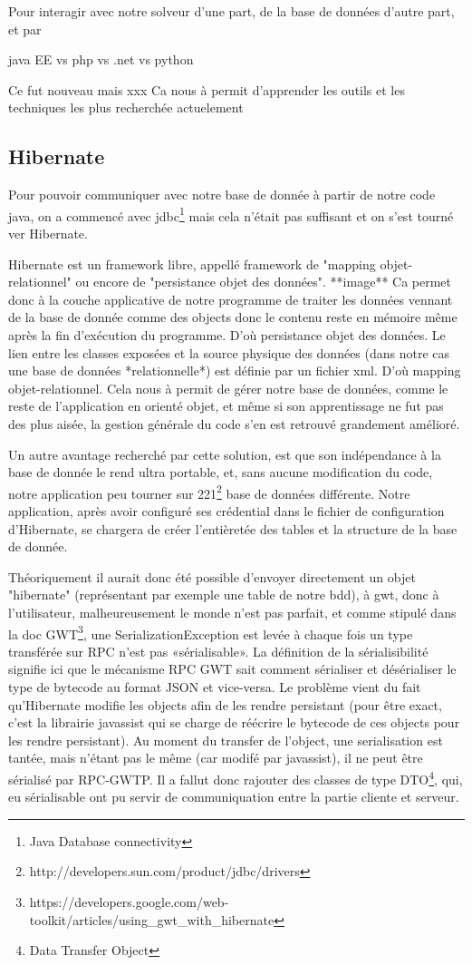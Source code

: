 Pour interagir avec notre solveur d'une part, de la base de données d'autre part, et par


java EE vs php vs .net vs python

Ce fut nouveau mais xxx
Ca nous à permit d'apprender les outils et les techniques les plus recherchée actuelement 

\subsection{Hibernate}

Pour pouvoir communiquer avec notre base de donnée à partir de notre code java, on a commencé avec jdbc\footnote{Java Database connectivity} mais cela n'était pas suffisant et on s'est tourné ver Hibernate.

Hibernate est un framework libre, appellé framework de  "mapping objet-relationnel" ou encore de "persistance objet des données". 
**image**
Ca permet donc à la couche applicative de notre programme de traiter les données vennant de la base de donnée comme des objects donc le contenu reste en mémoire même après la fin d'exécution du programme. D'où persistance objet des données. Le lien entre les classes exposées et la source physique des données (dans notre cas une base de données *relationnelle*) est définie par un fichier xml. D'où mapping objet-relationnel.
Cela nous à permit de gérer notre base de données, comme le reste de l'application en orienté objet, et même si son apprentissage ne fut pas des plus aisée, la gestion générale du code s'en est retrouvé grandement amélioré.

Un autre avantage recherché par cette solution, est que son indépendance à la base de donnée le rend ultra portable, et, sans aucune modification du code, notre application peu tourner sur 221\footnote{http://developers.sun.com/product/jdbc/drivers} base de données différente.  Notre application, après avoir configuré ses crédential dans le fichier de configuration d'Hibernate, se chargera de créer l'entièretée des tables et la structure de la base de donnée.

Théoriquement il aurait donc été possible d'envoyer directement un objet "hibernate" (représentant par exemple une table de notre bdd), à gwt, donc à l'utilisateur, malheureusement le monde n'est pas parfait, et comme stipulé dans la doc GWT\footnote{https://developers.google.com/web-toolkit/articles/using\_gwt\_with\_hibernate},
une SerializationException est levée à chaque fois un type transférée sur RPC n'est pas «sérialisable». La définition de la sérialisibilité signifie ici que le mécanisme RPC GWT sait comment sérialiser et désérialiser le type de bytecode au format JSON et vice-versa.
Le problème vient du fait qu'Hibernate modifie les objects afin de les rendre persistant (pour être exact, c'est la librairie javassist qui se charge de réécrire le bytecode de ces objects pour les rendre persistant). Au moment du transfer de l'object, une serialisation est tantée, mais n'étant pas le même (car modifé par javassist), il ne peut être sérialisé par RPC-GWTP.
Il a fallut donc rajouter des classes de type DTO\footnote{Data Transfer Object}, qui, eu sérialisable ont pu servir de communiquation entre la partie cliente et serveur.

